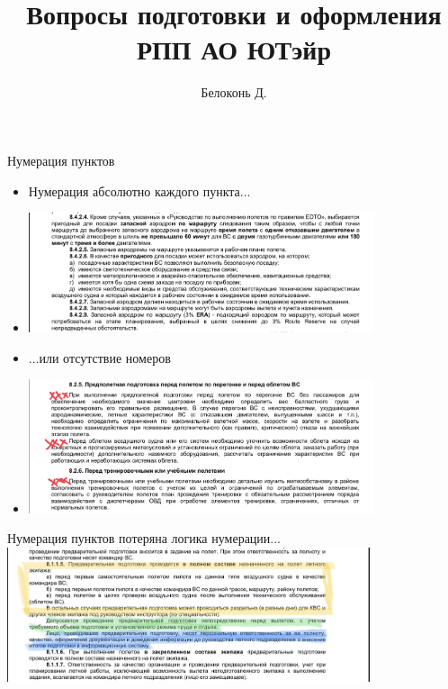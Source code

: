 \documentclass[utf8]{beamer}
\title{Вопросы подготовки и оформления РПП АО ЮТэйр}
\author{Белоконь Д.}
\begin{document}

\begin{frame}%
\titlepage
\end{frame}

\begin{frame}{Нумерация пунктов}    
            \begin{itemize}
                    \item<1-> Нумерация абсолютно каждого пункта...
                    \item<1-> \includegraphics[width=0.8\textwidth]{Numeric1.png}
                    \item<2-> ...или отсутствие номеров
                    \item<2-> \includegraphics[width=0.8\textwidth]{Numeric3.png}
            \end{itemize}              
\end{frame}

\begin{frame}{Нумерация пунктов}    
        потеряна логика нумерации...
        \includegraphics[width=0.8\textwidth]{Numeric4.png}            
\end{frame}
\end{document}
